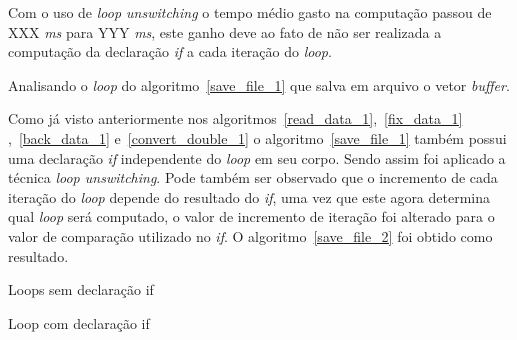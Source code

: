 Com o uso de \textit{loop unswitching} o tempo médio gasto na computação passou
de XXX \textit{ms} para YYY \textit{ms}, este ganho deve ao fato de não ser
realizada a computação da declaração \textit{if} a cada iteração do
\textit{loop}.



Analisando o \textit{loop} do algoritmo~\ref{save_file_1} que salva em arquivo o 
vetor \textit{buffer}.

Como já visto anteriormente nos algoritmos~\ref{read_data_1},~\ref{fix_data_1} 
,~\ref{back_data_1} e~\ref{convert_double_1} o algoritmo~\ref{save_file_1}
também possui uma declaração \textit{if} independente do \textit{loop} em seu
corpo. Sendo assim foi aplicado a técnica \textit{loop unswitching}.
Pode também ser observado que o incremento de cada iteração do \textit{loop}
depende do resultado do \textit{if}, uma vez que este agora determina qual
\textit{loop} será computado, o valor de incremento de iteração foi alterado
para o valor de comparação utilizado no \textit{if}. O
algoritmo~\ref{save_file_2} foi obtido como resultado.

\begin{algorithm}
\caption{Loops sem declaração if}
\label{save_file_1}

\end{algorithm}

\begin{algorithm}
\caption{Loop com declaração if }
\label{save_file_2}

\end{algorithm}


%


%
